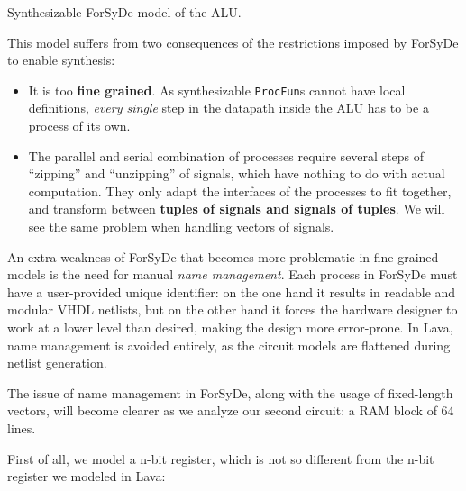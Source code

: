             \begin{listing}[h!]
                \caption{Synthesizable ForSyDe model of the ALU.
                    \label{lst:forsyde-circuit1-model-alusyn}}
            \end{listing}

            This model suffers from two consequences of the restrictions imposed by ForSyDe to
            enable synthesis:

            \begin{itemize}
                \item It is too \textbf{fine grained}. As synthesizable \texttt{ProcFun}s cannot
                    have local definitions, \emph{every single} step in the datapath inside the
                    ALU has to be a process of its own.

                \item The parallel and serial combination of processes require several steps of
                    ``zipping'' and ``unzipping'' of signals, which have nothing to do with actual
                    computation.  They only adapt the interfaces of the processes to fit together,
                    and transform between \textbf{tuples of signals and signals of tuples}. We will
                    see the same problem when handling vectors of signals.
            \end{itemize}

            An extra weakness of ForSyDe that becomes more problematic in fine-grained models is the
            need for manual \emph{name management}. Each process in ForSyDe must have a
            user-provided unique identifier: on the one hand it results in readable and modular VHDL
            netlists, but on the other hand it forces the hardware designer to work at a lower level
            than desired, making the design more error-prone. In Lava, name management is avoided
            entirely, as the circuit models are flattened during netlist generation.

            The issue of name management in ForSyDe, along with the usage of fixed-length vectors,
            will become clearer as we analyze our second circuit: a RAM block of 64 lines.

            First of all, we model a n-bit register, which is not so different from the n-bit
            register we modeled in Lava:


